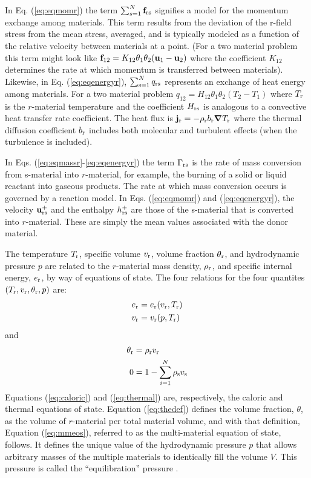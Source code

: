 In Eq. (\ref{eq:eqmomr}) the term $\sum_{s=1}^{N}\mathbf{f}_{{\rm r}{\rm s}}$ signifies
a model for the momentum exchange among materials.  This term results from
the deviation of the r-field stress from the mean stress, averaged, and is
typically modeled as a function of the relative velocity between materials
at a point. (For a two material problem this term might look like $\mathbf{f}_{12}
= K_{12}\theta_1\theta_2(\mathbf{u}_1 - \mathbf{u}_2)$ where the coefficient $K_{12}$
determines the rate at which momentum is transferred between materials).
Likewise, in Eq. (\ref{eq:eqenergyr}), $\sum_{{\rm s}=1}^{N} q_{{\rm r}{\rm s}}$
represents an exchange of heat energy among materials.  For a two material
problem $q_{12} = H_{12}\theta_1\theta_2(T_2 - T_1)$ where $T_{\rm r}$ is the
$r$-material temperature and the coefficient $H_{{\rm r}{\rm s}}$ is analogous to a
convective heat transfer rate coefficient.  The heat flux is $\mathbf{j}_{\rm r} =
-\rho_{\rm r} b_{\rm r} \boldsymbol{\nabla} T_{\rm r}$ where the thermal diffusion coefficient
$b_{\rm r}$ includes both molecular and turbulent effects (when the turbulence
is included).

In Eqs. (\ref{eq:eqmassr}-\ref{eq:eqenergyr}) the term $\Gamma_{{\rm r}{\rm s}}$ is
the rate of mass conversion from s-material into $r$-material, for example,
the burning of a solid or liquid reactant into gaseous products.  The rate at which
mass conversion occurs is governed by a reaction model.  In Eqs. (\ref{eq:eqmomr})
and (\ref{eq:eqenergyr}), the velocity $\mathbf{u}_{{\rm r}{\rm s}}^+$ and the enthalpy
$h_{{\rm r}{\rm s}}^+$ are those of the s-material that is converted into $r$-material.
These are simply the mean values associated with the donor material.

The temperature $T_{\rm r}$, specific volume $v_{\rm r}$, volume fraction
$\theta_{\rm r}$, and hydrodynamic pressure $p$ are related to the $r$-material
mass density, $\rho_{\rm r}$, and specific internal energy, $e_{\rm r}$, by way
of equations of state.  The four relations for the four quantites $(T_{\rm r},
v_{\rm r}, \theta_{\rm r}, p)$ are:
\begin{align}
e_{\rm r} &= e_{\rm r}(v_{\rm r}, T_{\rm r}) \label{eq:caloric} \\
v_{\rm r} &= v_{\rm r}(p, T_{\rm r}) \label{eq:thermal}
\end{align}
and
\begin{align}
\theta_{\rm r} &= \rho_{\rm r} v_{\rm r} \label{eq:thedef} \\
0 &= 1 - \sum_{i=1}^N\rho_{\rm s} v_{\rm s} \label{eq:mmeos}
\end{align}
Equations (\ref{eq:caloric}) and (\ref{eq:thermal}) are, respectively, the caloric
and thermal equations of state.  Equation (\ref{eq:thedef}) defines the volume
fraction, $\theta$, as the volume of $r$-material per total material volume,
and with that definition, Equation (\ref{eq:mmeos}), referred to as the
multi-material equation of state, follows.  It defines the unique value of
the hydrodynamic pressure $p$ that allows arbitrary masses of the multiple
materials to identically fill the volume $V$.  This pressure is called the
``equilibration'' pressure \cite{kashiwaICE94}.

